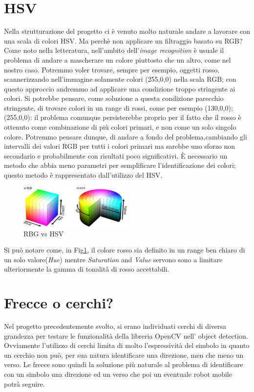 \section{HSV}
Nella strutturazione del progetto ci è venuto molto naturale andare a lavorare con una scala di colori HSV. Ma perchè non applicare un filtraggio basato su RGB?
Come noto nella letteratura, nell'ambito dell'\textit{image recognition} è usuale il problema di andare a mascherare un colore piuttosto che un altro, come nel nostro caso.
Potremmo voler trovare, sempre per esempio, oggetti rosso, scannerizzando nell'immagine solamente colori (255,0,0) nella scala RGB; con questo approccio andremmo ad applicare una condizione troppo stringente ai colori.
Si potrebbe pensare, come soluzione a questa condizione parecchio stringente, di trovare colori in un range di rossi, come per esempio {(130,0,0);(255,0,0)}: il problema comunque persisterebbe proprio per il fatto che il rosso è ottenuto come combinazione di più colori primari, e non come un solo singolo colore.
Potremmo pensare dunque, di andare a fondo del problema,cambiando gli intervalli dei valori RGB per tutti i colori primari ma sarebbe uno sforzo non secondario e probabilmente con risultati poco significativi.
È necessario un metodo che abbia meno parametri per semplificare l'identificazione dei colori; questo metodo è rappresentato dall'utilizzo del HSV.


\begin{figure}[H]
	\centering
	\includegraphics[width=0.5\textwidth]{Immagini/HSV_RGB.jpeg}
	\caption{RBG vs HSV}
	\label{fig:HSV}
\end{figure}
Si può notare come, in Fig\ref{fig:HSV}, il colore rosso sia definito in un range ben chiaro di un solo valore(\textit{Hue}) mentre \textit{Saturation }and \textit{Value} servono sono a limitare ulteriormente la gamma di tonalità di rosso accettabili. 
\section{Frecce o cerchi?}
Nel progetto precedentemente svolto, si erano individuati cerchi di diversa grandezza per testare le funzionalità della libreria OpenCV nell' object detection.
Ovviamente l'utilizzo di cerchi limita di molto l'espressività del simbolo in quanto un cerchio non può, per sua natura identificare una direzione, men che meno un verso.
Le frecce sono quindi la soluzione più naturale al problema di identificare con un simbolo una direzione ed un verso che poi un eventuale robot mobile potrà seguire.

